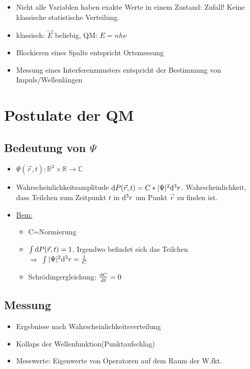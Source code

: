 \begin{itemize}
\begin{itemize}
							\item Nicht alle Variablen haben exakte Werte in einem Zustand: Zufall! Keine klassische statistische Verteilung.
							\item klassisch: $ \vec{E} $ beliebig, QM: $ E = n  h  \nu $
							\item Blockieren eines Spalts entspricht Ortsmessung
							\item Messung eines Interferenzmusters entspricht der Bestimmung von Impuls/Wellenlängen
						\end{itemize}
					\end{itemize}
					
				\section{Postulate der QM}
					\subsection{Bedeutung von $\Psi$}
						\begin{itemize}
							\item $ \Psi(\vec{r},t): \mathbb{R}^3 \times \mathbb{R} \rightarrow \mathbb{C}$
							\item Wahrscheinlichkeitsamplitude $ \mathrm{d} P(\vec{r},t) = C*|\Psi|^2 \mathrm{d}^3 r $. Wahrscheinlichkeit, dass Teilchen zum Zeitpunkt $ t $ in $ \mathrm{d}^3r $ um Punkt $ \vec{r} $ zu finden ist.
							\item \underline{Bem:} 
							\begin{itemize}
								\item C=Normierung
								\item $  \int \mathrm{d} P(\vec{r},t) = 1$, Irgendwo befindet sich das Teilchen \\
									$ \Longrightarrow $ $ \int |\Psi|^2 \mathrm{d}^3r = \frac{1}{C}$
								\item Schrödingergleichung: $ \frac{\mathrm{d} C}{\mathrm{d} t} = 0 $
							\end{itemize}
						\end{itemize}
						
						\subsection{Messung}
							\begin{itemize}
								\item Ergebnisse nach Wahrscheinlichkeitsverteilung
								\item Kollaps der Wellenfunktion(Punktaufschlag)
								\item Messwerte: Eigenwerte von Operatoren auf dem Raum der W.fkt. 
							\end{itemize}
						
